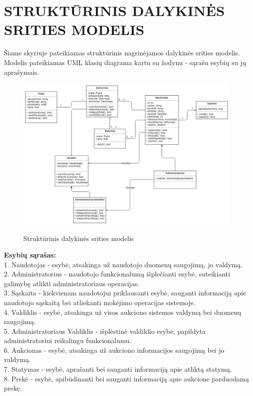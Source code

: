 \documentclass{VUMIFPSkursinis}
\begin{document}
	\section{STRUKTŪRINIS DALYKINĖS SRITIES MODELIS}
	Šiame skyriuje pateikiamas struktūrinis nagrinėjamos dalykinės srities modelis. Modelis pateikiamas UML klasių diagrama kartu su žodynu - sąrašu esybių su jų aprašymais.
	\begin{figure}[H]
		\centering
		\includegraphics[width=\linewidth]{img/umlClassDiagram.png}
		\label{fig:usecase}
		\caption{Struktūrinis dalykinės srities modelis}
	\end{figure}
	\noindent
	\textbf{Esybių sąrašas:} \\
	1. Naudotojas - esybė, atsakinga už naudotojo duomenų saugojimą, jo valdymą.\\
	2. Administratorius - naudotojo funkcionalumą išplečianti esybė, suteikianti galimybę atlikti administratoriaus operacijas.\\
	3. Sąskaita - kiekvienam naudotojui priklausanti esybė, sauganti informaciją apie naudotojo sąskaitą bei atliekanti mokėjimo operacijas sistemoje.\\
	4. Valdiklis - esybė, atsakinga už visos aukciono sistemos valdymą bei duomenų saugojimą.\\
	5. Administratoriaus Valdiklis - išplėstinė valdiklio esybė, papildyta administratoriui reikalingu funkcionalumu.\\
	6. Aukcionas - esybė, atsakinga už aukciono informacijos saugojimą bei jo valdymą.\\
	7. Statymas - esybė, aprašanti bei sauganti informaciją apie atliktą statymą.\\
	8. Prekė - esybė, apibūdinanti bei sauganti informaciją apie aukcione parduodamą prekę.\\
\end{document}
